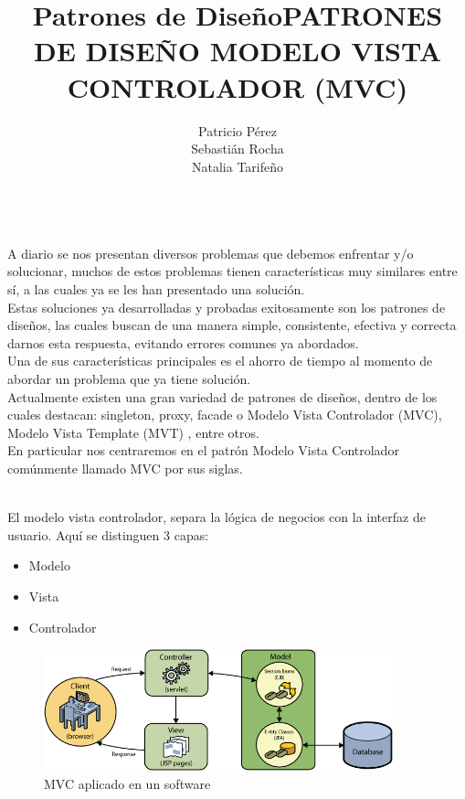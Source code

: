 \documentclass[a4paper,11pt]{report}
\begin{document}
\title{Patrones de Diseño}
\author{Patricio Pérez\\
        Sebastián Rocha\\
        Natalia Tarifeño}
\maketitle

\title {\textbf{PATRONES DE DISEÑO}}\\

A diario se nos presentan diversos problemas  que debemos enfrentar
y/o solucionar,
muchos de estos problemas tienen características muy similares entre sí, a las cuales ya se les han presentado una solución.\\
Estas soluciones ya desarrolladas y probadas exitosamente son los patrones de diseños,  las
cuales buscan de una manera simple, consistente, efectiva y correcta darnos esta respuesta, evitando errores comunes ya abordados.\\
Una de sus características principales es el ahorro de tiempo al momento de abordar un problema que ya tiene solución.\\
Actualmente existen una gran variedad de patrones de diseños, dentro
de los cuales destacan: singleton, proxy, facade o Modelo Vista Controlador (MVC), Modelo
Vista Template (MVT) , entre otros.\\
En particular nos centraremos en el patrón Modelo Vista Controlador comúnmente llamado MVC por sus siglas.\\

\title { \textbf{MODELO VISTA CONTROLADOR (MVC)}}\\

El modelo vista controlador, separa la lógica de negocios con la interfaz de usuario. Aquí se distinguen 3 capas:

\begin{itemize}
    \item{Modelo}
    \item{Vista}
    \item{Controlador}
\end{itemize}

\begin{figure}[!ht]
\begin{center}
  \includegraphics[width=0.9\textwidth]{mvc-diagram.png}
  \caption{MVC aplicado en un software}
\end{center}
\end{figure}
\end{document}
